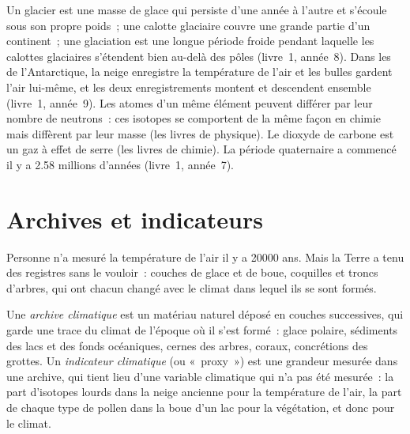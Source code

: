 \begin{recall}
Un glacier est une masse de glace qui persiste d'une année à l'autre et
s'écoule sous son propre poids~; une calotte glaciaire couvre une grande
partie d'un continent~; une glaciation est une longue période froide
pendant laquelle les calottes glaciaires s'étendent bien au-delà des pôles
(livre~1, année~8). Dans les  de l'Antarctique, la neige
enregistre la température de l'air et les bulles gardent l'air lui-même, et
les deux enregistrements montent et descendent ensemble (livre~1,
année~9). Les atomes d'un même élément peuvent différer par leur nombre de
neutrons~: ces isotopes se comportent de la même façon en chimie mais
diffèrent par leur masse (les livres de physique). Le dioxyde de carbone
est un gaz à effet de serre (les livres de chimie). La période quaternaire
a commencé il y a 2.58 millions d'années (livre~1, année~7).
\end{recall}

\section{Archives et indicateurs}

Personne n'a mesuré la température de l'air il y a \num{20000} ans. Mais la
Terre a tenu des registres sans le vouloir~: couches de glace et de boue,
coquilles et troncs d'arbres, qui ont chacun changé avec le climat dans
lequel ils se sont formés.

\begin{definition}\label{def:g12:past-climates:proxy}
Une \emph{archive climatique} est un matériau
naturel déposé en couches successives, qui garde une trace du climat de
l'époque où il s'est formé~: glace polaire, sédiments des lacs et des fonds
océaniques, cernes des arbres, coraux, concrétions des grottes. Un
\emph{indicateur climatique} (ou
«~proxy~») est une grandeur mesurée dans une archive, qui tient lieu
d'une variable climatique qui n'a pas été mesurée~: la part d'isotopes
lourds dans la neige ancienne pour la température de l'air, la part de
chaque type de pollen dans la boue d'un lac pour la végétation, et donc
pour le climat.
\end{definition}

